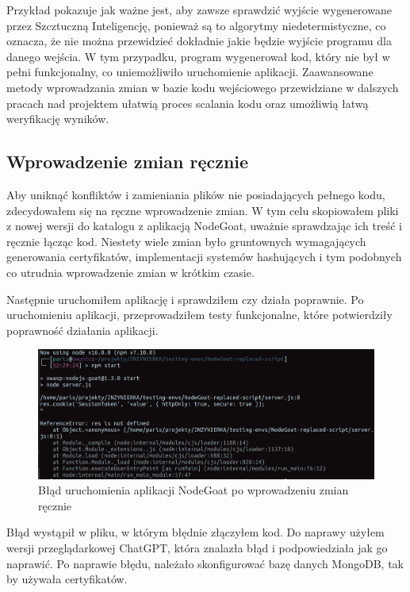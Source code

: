 Przykład pokazuje jak ważne jest, aby zawsze sprawdzić wyjście wygenerowane przez Szcztuczną Inteligencję, ponieważ są to algorytmy niedetermistyczne, co oznacza, że nie można przewidzieć dokładnie jakie będzie wyjście programu dla danego wejścia. W tym przypadku, program wygenerował kod, który nie był w pełni funkcjonalny, co uniemożliwiło uruchomienie aplikacji. Zaawansowane metody wprowadzania zmian w bazie kodu wejściowego przewidziane w dalszych pracach nad projektem ułatwią proces scalania kodu oraz umożliwią łatwą weryfikację wyników.

\subsection{Wprowadzenie zmian ręcznie}
Aby uniknąć konfliktów i zamieniania plików nie posiadających pełnego kodu, zdecydowałem się na ręczne wprowadzenie zmian. W tym celu skopiowałem pliki z nowej wersji do katalogu z aplikacją NodeGoat, uważnie sprawdzając ich treść i ręcznie łącząc kod. Niestety wiele zmian było gruntownych wymagających generowania certyfikatów, implementacji systemów hashujących i tym podobnych co utrudnia wprowadzenie zmian w krótkim czasie.

Następnie uruchomiłem aplikację i sprawdziłem czy działa poprawnie. Po uruchomieniu aplikacji, przeprowadziłem testy funkcjonalne, które potwierdziły poprawność działania aplikacji. 

\begin{figure}[H]
  \centering
  \includegraphics[width=\linewidth]{img/npm-start-error.png}
  \caption{Błąd uruchomienia aplikacji NodeGoat po wprowadzeniu zmian ręcznie}
  \label{fig:nodegoat-error-manual}
\end{figure}

Błąd wystąpił w pliku, w którym błędnie złączyłem kod. Do naprawy użyłem wersji przeglądarkowej ChatGPT, która znalazła błąd i podpowiedziała jak go naprawić. Po naprawie błędu, należało skonfigurować bazę danych MongoDB, tak by używała certyfikatów.

